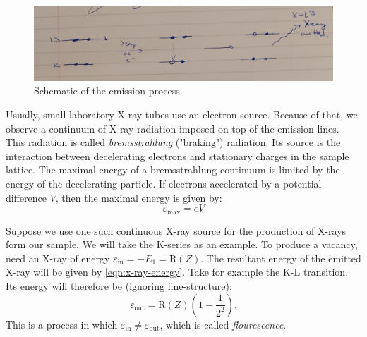 \documentclass[11pt,a4paper,twoside,onecolumn]{article}
\newcommand{\rydberg}{\mathrm{R}}
\begin{document}
\begin{figure}[!htb]
    \centering
    \includegraphics[width=\textwidth]{img/emission-diagram.png}
    \caption{Schematic of the emission process.}\label{fig:emission-diagram}
\end{figure}

Usually, small laboratory X-ray tubes use an electron source. Because of that, we observe a continuum of X-ray radiation imposed on top of the emission lines. This radiation is called \emph{bremsstrahlung} ("braking") radiation. Its source is the interaction between decelerating electrons and stationary charges in the sample lattice. The maximal energy of a bremsstrahlung continuum is limited by the energy of the decelerating particle. If electrons accelerated by a potential difference $V$, then the maximal energy is given by:
\begin{equation}
    \varepsilon_\mathrm{max} = eV
\end{equation}

Suppose we use one such continuous X-ray source for the production of X-rays form our sample. We will take the K-series as an example. To produce a vacancy, need an X-ray of energy $\varepsilon_\mathrm{in} = - E_1 = \rydberg(Z)$. The resultant energy of the emitted X-ray will be given by \eqref{eqn:x-ray-energy}. Take for example the K-L transition. Its energy will therefore be (ignoring fine-structure):
\begin{equation}
    \varepsilon_\mathrm{out} = \rydberg\left(Z\right) \left(1 - \frac{1}{2^2}\right).
\end{equation}
This is a process in which $\varepsilon_\mathrm{in} \neq \varepsilon_\mathrm{out}$, which is called \emph{flourescence}.
\end{document}
